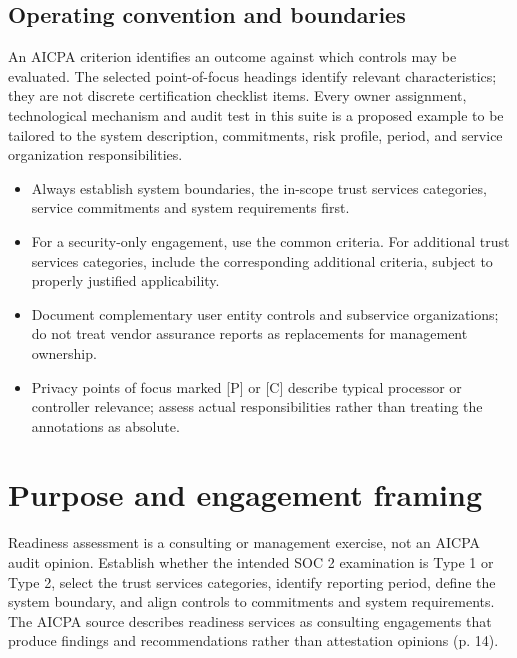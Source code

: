 \documentclass[10pt,oneside]{report}
\begin{document}
\section*{Operating convention and boundaries}
An AICPA criterion identifies an outcome against which controls may be evaluated. The selected point-of-focus headings identify relevant characteristics; they are not discrete certification checklist items. Every owner assignment, technological mechanism and audit test in this suite is a proposed example to be tailored to the system description, commitments, risk profile, period, and service organization responsibilities.

\begin{itemize}
\item Always establish system boundaries, the in-scope trust services categories, service commitments and system requirements first.
\item For a security-only engagement, use the common criteria. For additional trust services categories, include the corresponding additional criteria, subject to properly justified applicability.
\item Document complementary user entity controls and subservice organizations; do not treat vendor assurance reports as replacements for management ownership.
\item Privacy points of focus marked [P] or [C] describe typical processor or controller relevance; assess actual responsibilities rather than treating the annotations as absolute.
\end{itemize}

\chapter{Purpose and engagement framing}
Readiness assessment is a consulting or management exercise, not an AICPA audit opinion. Establish whether the intended SOC 2 examination is Type 1 or Type 2, select the trust services categories, identify reporting period, define the system boundary, and align controls to commitments and system requirements. The AICPA source describes readiness services as consulting engagements that produce findings and recommendations rather than attestation opinions (p. 14).
\end{document}
